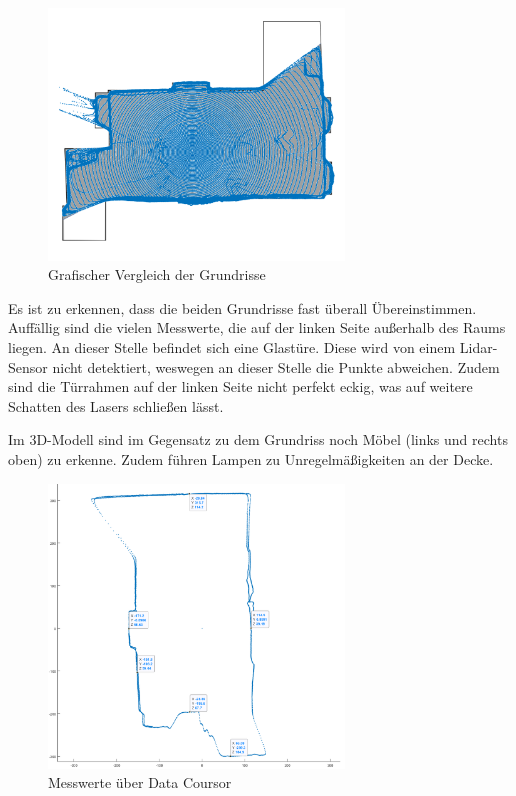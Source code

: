 \begin{figure}[H]
	\centering
	\includegraphics[width=0.7\textwidth]{images/Validierung/uebereinander}
	\caption{Grafischer Vergleich der Grundrisse}
	\label{uebereinander}
\end{figure}


Es ist zu erkennen, dass die beiden Grundrisse fast überall Übereinstimmen. Auffällig sind die vielen Messwerte, die auf der linken Seite außerhalb des Raums liegen. An dieser Stelle befindet sich eine Glastüre. Diese wird von einem Lidar-Sensor nicht detektiert, weswegen an dieser Stelle die Punkte abweichen. Zudem sind die Türrahmen auf der linken Seite nicht perfekt eckig, was auf weitere Schatten des Lasers schließen lässt.

Im 3D-Modell sind im Gegensatz zu dem Grundriss noch Möbel (links und rechts oben) zu erkenne. Zudem führen Lampen zu Unregelmäßigkeiten an der Decke.


\begin{figure}[H]
	\centering
	\includegraphics[width=0.7\textwidth]{images/Validierung/Genauigkeit/Messwerte.png}
	\caption{Messwerte über Data Coursor}
	\label{uebereinanawsdfder}
\end{figure}


